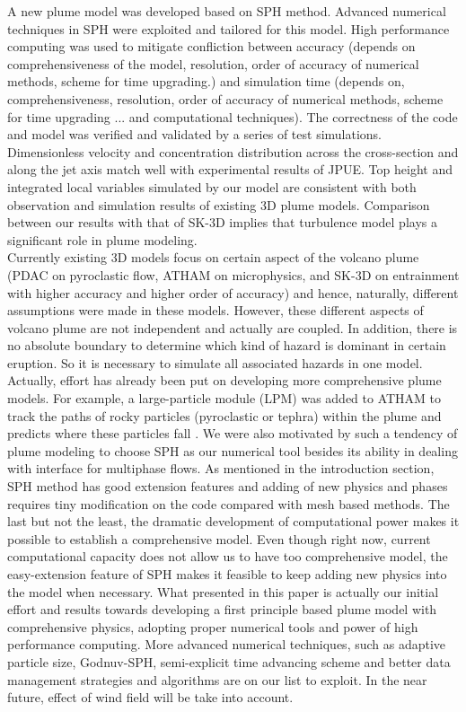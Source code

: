 \documentclass[journal abbreviation, manuscript]{copernicus}
\begin{document}
A new plume model was developed based on SPH method. Advanced numerical techniques in SPH were exploited and tailored for this model. High performance computing was used to mitigate confliction between accuracy (depends on comprehensiveness of the model, resolution, order of accuracy of numerical methods, scheme for time upgrading.) and simulation time (depends on, comprehensiveness, resolution, order of accuracy of numerical methods, scheme for time upgrading ... and computational techniques). The correctness of the code and model was verified and validated by a series of test simulations. Dimensionless velocity and concentration distribution across the cross-section and along the jet axis match well with experimental results of JPUE. Top height and integrated local variables simulated by our model are consistent with both observation and simulation results of existing 3D plume models. Comparison between our results with that of SK-3D implies that turbulence model plays a significant role in plume modeling.\\
Currently existing 3D models focus on certain aspect of the volcano plume (PDAC on pyroclastic flow, ATHAM on microphysics, and SK-3D on entrainment with higher accuracy and higher order of accuracy) and hence, naturally, different assumptions were made in these models. However, these different aspects of volcano plume are not independent and actually are coupled. In addition, there is no absolute boundary to determine which kind of hazard is dominant in certain eruption. So it is necessary to simulate all associated hazards in one model. Actually, effort has already been put on developing more comprehensive plume models. For example, a large-particle module (LPM) was added to ATHAM to track the paths of rocky particles (pyroclastic or tephra) within the plume and predicts where these particles fall \citep{kobs2009modeling}. We were also motivated by such a tendency of plume modeling to choose SPH as our numerical tool besides its ability in dealing with interface for multiphase flows. As mentioned in the introduction section, SPH method has good extension features and adding of new physics and phases requires tiny modification on the code compared with mesh based methods. The last but not the least, the dramatic development of computational power makes it possible to establish a comprehensive model. Even though right now, current computational capacity does not allow us to have too comprehensive model, the easy-extension feature of SPH makes it feasible to keep adding new physics into the model when necessary. What presented in this paper is actually our initial effort and results towards developing a first principle based plume model with comprehensive physics, adopting proper numerical tools and power of high performance computing. More advanced numerical techniques, such as adaptive particle size, Godnuv-SPH, semi-explicit time advancing scheme and better data management strategies and algorithms are on our list to exploit. In the near future, effect of wind field will be take into account. 
\end{document}
